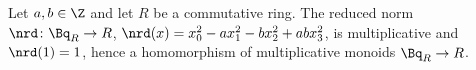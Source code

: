 Let $a,b\in\Z$ and let $R$ be a commutative ring. The reduced norm $\nrd\colon\Bq_R\to R$,
$\nrd(x)=x_0^2-ax_1^2-bx_2^2+abx_3^2$, is multiplicative and $\nrd(1)=1$, hence a homomorphism of multiplicative monoids $\Bq_R\to R$.
